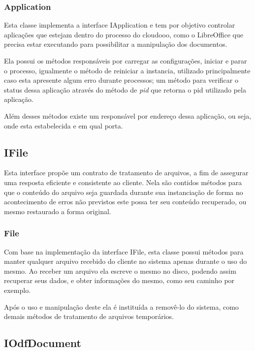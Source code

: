 \subsubsection{Application}
\label{application}

Esta classe implementa a interface IApplication e tem por objetivo controlar aplicações que estejam dentro do processo do cloudooo, como o LibreOffice que precisa estar executando para possibilitar a manipulação dos documentos.

Ela possui os métodos responsáveis por carregar as configurações, iniciar e parar o processo, igualmente o método de reiniciar a instancia, utilizado principalmente caso esta apresente algum erro durante processos; um método para verificar o status dessa aplicação através do método de \textit{pid} que retorna o pid utilizado pela aplicação.

Além desses métodos existe um responsável por endereço dessa aplicação, ou seja, onde esta estabelecida e em qual porta.

\subsection{IFile}
\label{ifile}

Esta interface propõe um contrato de tratamento de arquivos, a fim de assegurar uma resposta eficiente e consistente ao cliente. Nela são contidos métodos para que o conteúdo do arquivo seja guardada durante sua instanciação de forma no acontecimento de erros não previstos este possa ter seu conteúdo recuperado, ou mesmo restaurado a forma original.

\subsubsection{File}
\label{file}

Com base na implementação da interface IFile, esta classe possui métodos para manter qualquer arquivo recebido do cliente no sistema apenas durante o uso do mesmo. Ao receber um arquivo ela escreve o mesmo no disco, podendo assim recuperar seus dados, e obter informações do mesmo, como seu caminho por exemplo.

Após o uso e manipulação deste ela é instituída a removê-lo do sistema, como demais métodos de tratamento de arquivos temporários.

\subsection{IOdfDocument}

